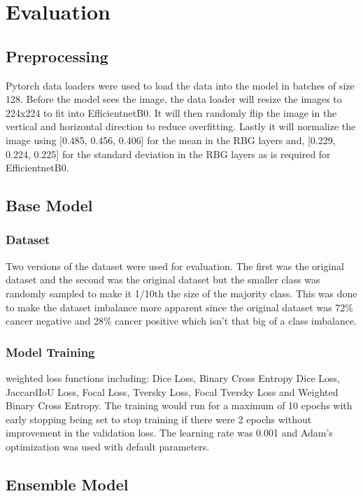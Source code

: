 \documentclass[conference]{IEEEtran}
\begin{document}
\section{Evaluation}
\subsection{Preprocessing}
Pytorch data loaders were used to load the data into the model in batches of
size 128. Before the model sees the image, the data loader will resize the
images to 224x224 to fit into EfficientnetB0. It will then randomly flip the
image in the vertical and horizontal direction to reduce overfitting. Lastly
it will normalize the image using [0.485, 0.456, 0.406] for the mean in the
RBG layers and, [0.229, 0.224, 0.225] for the standard deviation in the RBG
layers as is required for EfficientnetB0.

\subsection{Base Model}
\subsubsection{Dataset}
Two versions of the dataset were used for evaluation. The first was the
original dataset and the second was the original dataset but the smaller class
was randomly sampled to make it 1/10th the size of the majority class. This was
done to make the dataset imbalance more apparent since the original dataset was
72\% cancer negative and 28\% cancer positive which isn’t that big of a class
imbalance.
\subsubsection{Model Training}
weighted loss functions including: Dice Loss, Binary Cross Entropy Dice Loss,
JaccardIoU Loss, Focal Loss, Tversky Loss, Focal Tversky Loss and Weighted
Binary Cross Entropy. The training would run for a maximum of 10 epochs with
early stopping being set to stop training if there were 2 epochs without
improvement in the validation loss. The learning rate was 0.001 and Adam’s
optimization was used with default parameters.

\subsection{Ensemble Model}
\end{document}
